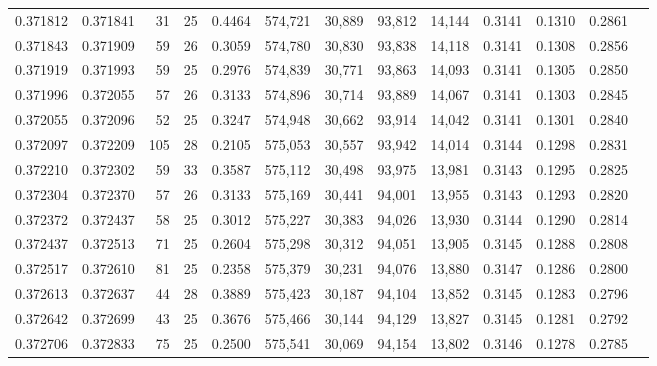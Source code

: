\begin{tabular}{rrrrrrrrrrrrr}
0.371812 & 0.371841 &    31 &  25 &                                     0.4464 & 574,721 &  30,889 &  93,812 &  14,144 & 0.3141 & 0.1310 & 0.2861 \\
0.371843 & 0.371909 &    59 &  26 &                                     0.3059 & 574,780 &  30,830 &  93,838 &  14,118 & 0.3141 & 0.1308 & 0.2856 \\
0.371919 & 0.371993 &    59 &  25 &                                     0.2976 & 574,839 &  30,771 &  93,863 &  14,093 & 0.3141 & 0.1305 & 0.2850 \\
0.371996 & 0.372055 &    57 &  26 &                                     0.3133 & 574,896 &  30,714 &  93,889 &  14,067 & 0.3141 & 0.1303 & 0.2845 \\
0.372055 & 0.372096 &    52 &  25 &                                     0.3247 & 574,948 &  30,662 &  93,914 &  14,042 & 0.3141 & 0.1301 & 0.2840 \\
0.372097 & 0.372209 &   105 &  28 &                                     0.2105 & 575,053 &  30,557 &  93,942 &  14,014 & 0.3144 & 0.1298 & 0.2831 \\
0.372210 & 0.372302 &    59 &  33 &                                     0.3587 & 575,112 &  30,498 &  93,975 &  13,981 & 0.3143 & 0.1295 & 0.2825 \\
0.372304 & 0.372370 &    57 &  26 &                                     0.3133 & 575,169 &  30,441 &  94,001 &  13,955 & 0.3143 & 0.1293 & 0.2820 \\
0.372372 & 0.372437 &    58 &  25 &                                     0.3012 & 575,227 &  30,383 &  94,026 &  13,930 & 0.3144 & 0.1290 & 0.2814 \\
0.372437 & 0.372513 &    71 &  25 &                                     0.2604 & 575,298 &  30,312 &  94,051 &  13,905 & 0.3145 & 0.1288 & 0.2808 \\
0.372517 & 0.372610 &    81 &  25 &                                     0.2358 & 575,379 &  30,231 &  94,076 &  13,880 & 0.3147 & 0.1286 & 0.2800 \\
0.372613 & 0.372637 &    44 &  28 &                                     0.3889 & 575,423 &  30,187 &  94,104 &  13,852 & 0.3145 & 0.1283 & 0.2796 \\
0.372642 & 0.372699 &    43 &  25 &                                     0.3676 & 575,466 &  30,144 &  94,129 &  13,827 & 0.3145 & 0.1281 & 0.2792 \\
0.372706 & 0.372833 &    75 &  25 &                                     0.2500 & 575,541 &  30,069 &  94,154 &  13,802 & 0.3146 & 0.1278 & 0.2785 \\

\end{tabular}
